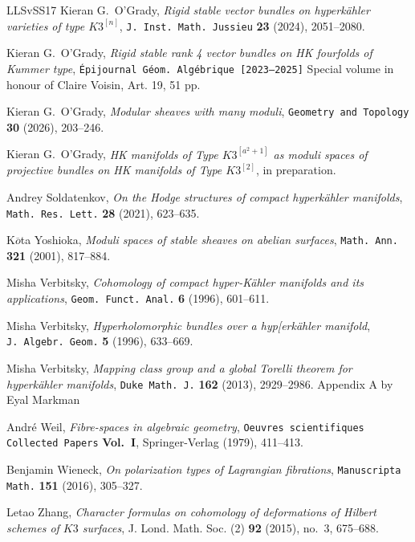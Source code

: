 \documentclass[11pt]{amsart}
\newcommand{\ov}{\overline}
\theoremstyle{definition}
\theoremstyle{remark}
\begin{document}
\begin{thebibliography}{LLSvSS17}
 Kieran G.~O'Grady, \emph{Rigid stable vector bundles on hyperk\"ahler varieties of type $K3^{[n]}$\/},  
{\tt J.~Inst.~Math.~Jussieu} {\bf    23} (2024),  2051--2080.

 Kieran G.~O'Grady, \emph{Rigid stable rank 4 vector bundles on HK fourfolds of Kummer type\/},  
{\tt \'Epijournal G\'eom. Alg\'ebrique [2023–2025]}  Special volume in honour of Claire Voisin, Art. 19, 51 pp.


 Kieran G.~O'Grady, \emph{Modular sheaves with many moduli\/},  
{\tt  Geometry and Topology} {\bf  30} (2026), 203--246.
% 


 Kieran G.~O'Grady, \emph{HK manifolds of Type $K3^{[a^2+1]}$ as moduli spaces of projective bundles on  HK manifolds of Type $K3^{[2]}$\/},  
in preparation.
% 


 Andrey Soldatenkov, \emph{On the Hodge structures of compact hyperkähler manifolds\/},  
{\tt Math.~Res.~Lett.} {\bf   28} (2021),  623--635.

 K$\ov{o}$ta Yoshioka, \emph{Moduli spaces of stable sheaves 
on abelian surfaces\/},  
{\tt  Math.~Ann.} {\bf  321} (2001), 817--884.

 Misha Verbitsky, \emph{Cohomology of compact hyper-K\"ahler manifolds and its
  applications\/},  
{\tt  Geom.~Funct.~Anal.} {\bf  6} (1996),  601--611.
 
 
 Misha Verbitsky, \emph{Hyperholomorphic bundles over a hyp[erk\"ahler manifold\/},  
{\tt  J.~Algebr.~Geom.} {\bf  5} (1996),  633--669.
  
 Misha Verbitsky, \emph{Mapping class group and a global Torelli theorem for hyperk\"ahler manifolds\/},  
{\tt Duke Math. J.} {\bf  162} (2013),  2929--2986. Appendix A by Eyal Markman

 Andr\'e Weil, \emph{Fibre-spaces in algebraic geometry\/},  
{\tt  Oeuvres scientifiques Collected Papers} {\bf  Vol.~I},   Springer-Verlag (1979), 411--413.

Benjamin Wieneck, \emph{On polarization types of Lagrangian fibrations\/},
{\tt    Manuscripta Math.} {\bf 151} (2016), 305--327. 

Letao Zhang, \emph{Character formulas on cohomology of deformations of
  {H}ilbert schemes of {$K3$} surfaces}, J. Lond. Math. Soc. (2) \textbf{92}
  (2015), no.~3, 675--688. 


\end{thebibliography}
\end{document}
